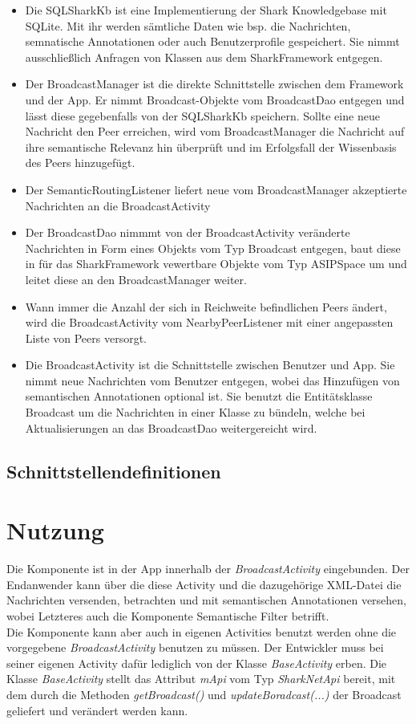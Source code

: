 \begin{itemize}
	\item Die SQLSharkKb ist eine Implementierung der Shark Knowledgebase mit SQLite. Mit ihr werden sämtliche Daten wie bsp. die Nachrichten, semnatische Annotationen oder auch Benutzerprofile gespeichert. Sie nimmt ausschließlich Anfragen von Klassen aus dem SharkFramework entgegen.
	\item Der BroadcastManager ist die direkte Schnittstelle zwischen dem Framework und der App. Er nimmt Broadcast-Objekte vom BroadcastDao entgegen und lässt diese gegebenfalls von der SQLSharkKb speichern. Sollte eine neue Nachricht den Peer erreichen, wird vom BroadcastManager die Nachricht auf ihre semantische Relevanz hin überprüft und im Erfolgsfall der Wissenbasis des Peers hinzugefügt.
	\item Der SemanticRoutingListener liefert neue vom BroadcastManager akzeptierte Nachrichten an die BroadcastActivity
	\item Der BroadcastDao nimmmt von der BroadcastActivity veränderte Nachrichten in Form eines Objekts vom Typ Broadcast entgegen, baut diese in für das SharkFramework vewertbare Objekte vom Typ ASIPSpace um und leitet diese an den BroadcastManager weiter.
	\item Wann immer die Anzahl der sich in Reichweite befindlichen Peers ändert, wird die BroadcastActivity vom NearbyPeerListener mit einer angepassten Liste von Peers versorgt.
	\item Die BroadcastActivity ist die Schnittstelle zwischen Benutzer und App. Sie nimmt neue Nachrichten vom Benutzer entgegen, wobei das Hinzufügen von semantischen Annotationen optional ist. Sie benutzt die Entitätsklasse Broadcast um die Nachrichten in einer Klasse zu bündeln, welche bei Aktualisierungen an das BroadcastDao weitergereicht wird. 
\end{itemize}

\subsection{Schnittstellendefinitionen}\label{ch:broadcastinterfaces}


\section{Nutzung}
Die Komponente ist in der App innerhalb der \textit{BroadcastActivity} eingebunden. Der Endanwender kann über die diese Activity und die dazugehörige XML-Datei die Nachrichten versenden, betrachten und mit semantischen Annotationen versehen, wobei Letzteres auch die Komponente Semantische Filter betrifft.
\\Die Komponente kann aber auch in eigenen Activities benutzt werden ohne die vorgegebene \textit{BroadcastActivity} benutzen zu müssen. Der Entwickler muss bei seiner eigenen Activity dafür lediglich von der Klasse \textit{BaseActivity} erben. Die Klasse \textit{BaseActivity} stellt das Attribut \textit{mApi} vom Typ \textit{SharkNetApi} bereit, mit dem durch die Methoden \textit{getBroadcast()} und \textit{updateBoradcast(...)} der Broadcast geliefert und verändert werden kann.
\\

